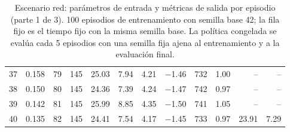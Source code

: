 \begin{table}[H]
\begin{tabular}{rrrrrrrrrrrr}
37 & 0.158 & 79 & 145 & 25.03 & 7.94 & 4.21 & $-$1.46 & 732 & 1.00 & -- & -- \\
38 & 0.150 & 80 & 145 & 24.36 & 7.39 & 4.24 & $-$1.47 & 742 & 0.97 & -- & -- \\
39 & 0.142 & 81 & 145 & 25.99 & 8.85 & 4.35 & $-$1.50 & 741 & 1.05 & -- & -- \\
40 & 0.135 & 82 & 145 & 24.41 & 7.54 & 4.17 & $-$1.45 & 733 & 0.97 & 23.91 & 7.29 \\
\bottomrule
\end{tabular}
\caption[Escenario red: episodios de entrenamiento (parte 1 de 3)]{Escenario red: parámetros de entrada y métricas de salida por episodio (parte 1 de 3). 100 episodios de entrenamiento con semilla base 42; la fila fijo es el tiempo fijo con la misma semilla base. La política congelada se evalúa cada 5 episodios con una semilla fija ajena al entrenamiento y a la evaluación final.}
\label{tab:red-episodios}
\end{table}

